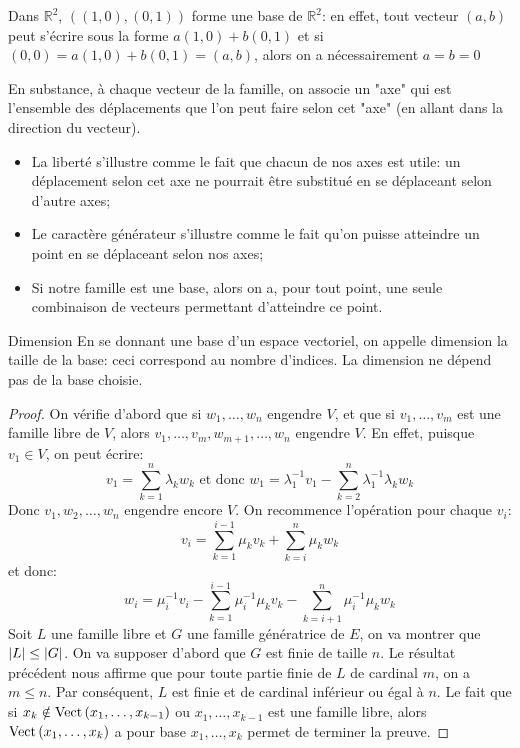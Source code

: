 \documentclass{classe}
\begin{document}
\begin{example}
Dans $\mathbb{R}^2$, $((1, 0),(0, 1))$ forme une base de $\mathbb{R}^2$: en effet, tout vecteur $(a, b)$ peut s'écrire sous la forme $a(1, 0) + b(0, 1)$ et si $(0, 0) = a(1, 0) + b(0, 1) = (a, b)$, alors on a nécessairement $a=b=0$
\end{example}

En substance, à chaque vecteur de la famille, on associe un "axe" qui est l'ensemble des déplacements que l'on peut faire selon cet "axe" (en allant dans la direction du vecteur).
\begin{itemize}
	\item La liberté s'illustre comme le fait que chacun de nos axes est utile: un déplacement selon cet axe ne pourrait être substitué en se déplaceant selon d'autre axes;
	\item Le caractère générateur s'illustre comme le fait qu'on puisse atteindre un point en se déplaceant selon nos axes;
	\item Si notre famille est une base, alors on a, pour tout point, une seule combinaison de vecteurs permettant d'atteindre ce point.
\end{itemize}

\begin{définition}{Dimension}{}
	En se donnant une base d'un espace vectoriel, on appelle dimension la taille de la base: ceci correspond au nombre d'indices. La dimension ne dépend pas de la base choisie.
\end{définition}
\begin{proof}
	On vérifie d'abord que si $w_{1}, \ldots, w_{n}$ engendre $V$, et que si $v_{1}, \ldots, v_{m}$ est une famille libre de $V$, alors $v_{1}, \ldots, v_{m}, w_{m + 1}, \ldots, w_{n}$ engendre $V$.
	En effet, puisque $v_{1} \in V$, on peut écrire:
	\begin{equation*}
		v_{1} = \sum_{k = 1}^{n} \lambda_{k}w_{k} \text{ et donc } w_{1} = \lambda_{1}^{-1}v_{1} - \sum_{k = 2}^{n} \lambda_{1}^{-1}\lambda_{k}w_{k}
	\end{equation*}
	Donc $v_{1}, w_{2}, \ldots, w_{n}$ engendre encore $V$.
	On recommence l'opération pour chaque $v_{i}$:
	\begin{equation*}
		v_{i} = \sum_{k = 1}^{i - 1}\mu_{k}v_{k} + \sum_{k = i}^{n}\mu_{k}w_{k}
	\end{equation*}
	et donc:
	\begin{equation*}
		w_{i} = \mu_{i}^{-1}v_{i} - \sum_{k = 1}^{i - 1}\mu_{i}^{-1}\mu_{k}v_{k} - \sum_{k = i + 1}^{n}\mu_{i}^{-1}\mu_{k}w_{k}
	\end{equation*}
	Soit $L$ une famille libre et $G$ une famille génératrice de $E$, on va montrer que $\left|L\right| \leq \left|G\right|$.
	On va supposer d'abord que $G$ est finie de taille $n$. Le résultat précédent nous affirme que pour toute partie finie de $L$ de cardinal $m$, on a $m \leq n$.
	Par conséquent, $L$ est finie et de cardinal inférieur ou égal à $n$.
	Le fait que si $x_{k} \notin \operatorname{Vect}\left( x_{1}, \ldots, x_{k - 1} \right)$ ou $x_{1}, \ldots, x_{k - 1}$ est une famille libre, alors $\operatorname{Vect}\left( x_{1}, \ldots, x_{k} \right)$ a pour base $x_{1}, \ldots, x_{k}$ permet de terminer la preuve.
\end{proof}
\end{document}
